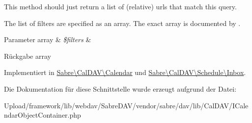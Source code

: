 This method should just return a list of (relative) urls that match this query.

The list of filters are specified as an array. The exact array is documented by .


\begin{DoxyParams}[1]{Parameter}
array & {\em \$filters} & \\
\hline
\end{DoxyParams}
\begin{DoxyReturn}{Rückgabe}
array 
\end{DoxyReturn}


Implementiert in \mbox{\hyperlink{class_sabre_1_1_cal_d_a_v_1_1_calendar_a2a1378d9365a94fb2a301cf46e820b1a}{Sabre\textbackslash{}\+Cal\+D\+A\+V\textbackslash{}\+Calendar}} und \mbox{\hyperlink{class_sabre_1_1_cal_d_a_v_1_1_schedule_1_1_inbox_ac6cfa0cf27a7ed24ab31747623c62269}{Sabre\textbackslash{}\+Cal\+D\+A\+V\textbackslash{}\+Schedule\textbackslash{}\+Inbox}}.



Die Dokumentation für diese Schnittstelle wurde erzeugt aufgrund der Datei\+:\begin{DoxyCompactItemize}
\item 
Upload/framework/lib/webdav/\+Sabre\+D\+A\+V/vendor/sabre/dav/lib/\+Cal\+D\+A\+V/I\+Calendar\+Object\+Container.\+php\end{DoxyCompactItemize}
